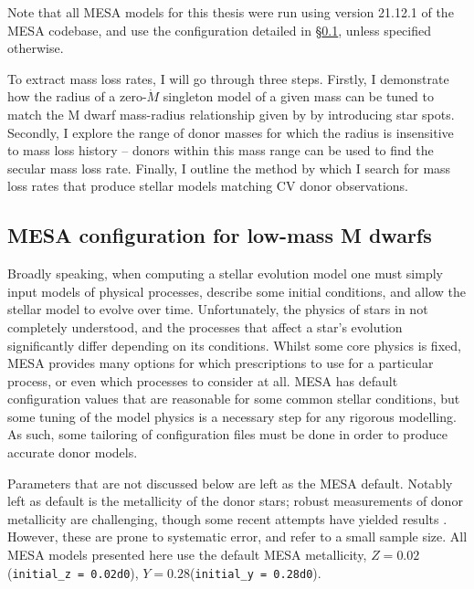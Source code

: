 Note that all MESA models for this thesis were run using version 21.12.1 of the MESA codebase, and use the configuration detailed in \S\ref{sect:modelling:MESA configs}, unless specified otherwise.

To extract mass loss rates, I will go through three steps.
Firstly, I demonstrate how the radius of a zero-$\dot M$ singleton model of a given mass can be tuned to match the M dwarf mass-radius relationship given by \citet{brown2022} by introducing star spots.
Secondly, I explore the range of donor masses for which the radius is insensitive to mass loss history -- donors within this mass range can be used to find the secular mass loss rate.
Finally, I outline the method by which I search for mass loss rates that produce stellar models matching CV donor observations.


\subsection{MESA configuration for low-mass M dwarfs}
\label{sect:modelling:MESA configs}

Broadly speaking, when computing a stellar evolution model one must simply input models of physical processes, describe some initial conditions, and allow the stellar model to evolve over time. Unfortunately, the physics of stars in not completely understood, and the processes that affect a star's evolution significantly differ depending on its conditions.
Whilst some core physics is fixed, MESA provides many options for which prescriptions to use for a particular process, or even which processes to consider at all.
MESA has default configuration values that are reasonable for some common stellar conditions, but some tuning of the model physics is a necessary step for any rigorous modelling.
As such, some tailoring of configuration files must be done in order to produce accurate donor models.

Parameters that are not discussed below are left as the MESA default.
Notably left as default is the metallicity of the donor stars; robust measurements of donor metallicity are challenging, though some recent attempts have yielded results \citep{harrison2016,harrison2018}. However, these are prone to systematic error, and refer to a small sample size. All MESA models presented here use the default MESA metallicity, $Z = 0.02$ (\lstinline{initial_z = 0.02d0}), $Y = 0.28$(\lstinline{initial_y = 0.28d0}).


